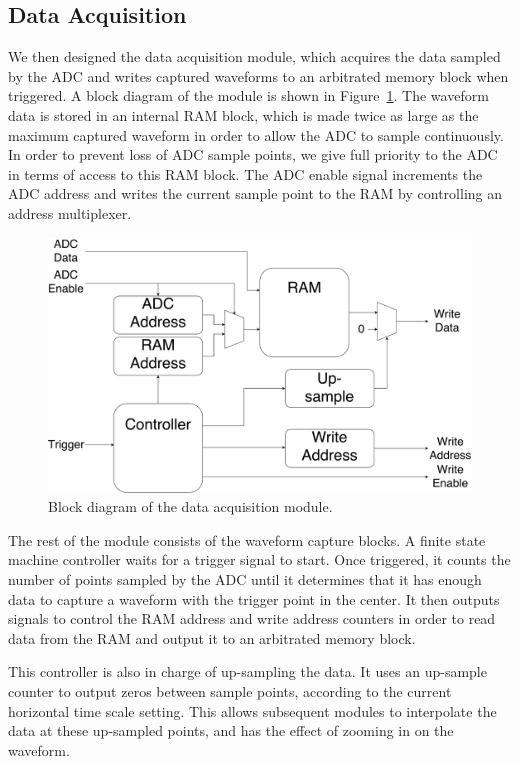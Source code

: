 \documentclass[journal]{IEEEtran}
\begin{document}
\subsection{Data Acquisition}

We then designed the data acquisition module, which acquires the data sampled by the ADC and writes captured waveforms to an arbitrated memory block when triggered. A block diagram of the module is shown in Figure~\ref{fig:data_acquisition}. The waveform data is stored in an internal RAM block, which is made twice as large as the maximum captured waveform in order to allow the ADC to sample continuously. In order to prevent loss of ADC sample points, we give full priority to the ADC in terms of access to this RAM block. The ADC enable signal increments the ADC address and writes the current sample point to the RAM by controlling an address multiplexer.

\begin{figure}[!htb]
  \centering
  \includegraphics[width=\columnwidth]{diagrams/data_acquisition.pdf}
  \caption{Block diagram of the data acquisition module.}
  \label{fig:data_acquisition}
\end{figure}

The rest of the module consists of the waveform capture blocks. A finite state machine controller waits for a trigger signal to start. Once triggered, it counts the number of points sampled by the ADC until it determines that it has enough data to capture a waveform with the trigger point in the center. It then outputs signals to control the RAM address and write address counters in order to read data from the RAM and output it to an arbitrated memory block.

This controller is also in charge of up-sampling the data. It uses an up-sample counter to output zeros between sample points, according to the current horizontal time scale setting. This allows subsequent modules to interpolate the data at these up-sampled points, and has the effect of zooming in on the waveform.
\end{document}
